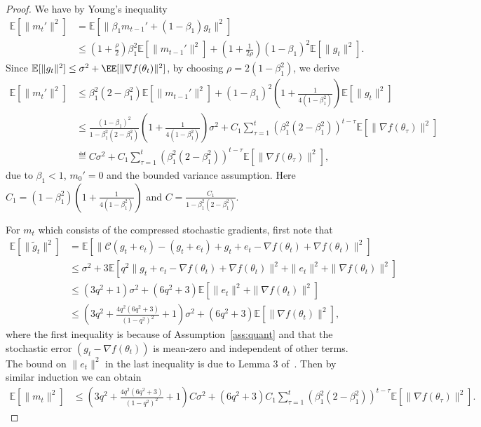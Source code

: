 \documentclass[11pt]{article}
\begin{document}
\begin{proof}
We have by Young's inequality
\begin{align*}
    \mathbb E[\|m_t'\|^2]&=\mathbb E[\|\beta_1m_{t-1}'+(1-\beta_1)g_t\|^2]\\
    &\leq (1+\frac{\rho}{2})\beta_1^2 \mathbb E[\|m_{t-1}'\|^2]+(1+\frac{1}{2\rho})(1-\beta_1)^2 \mathbb E[\|g_t\|^2].
\end{align*}
Since $\mathbb E[\|g_t\|^2]\leq \sigma^2+ \EE[\|\nabla f(\theta_t)\|^2]$, by choosing $\rho=2(1-\beta_1^2)$, we derive
\begin{align}
    \mathbb E[\|m_t'\|^2]&\leq \beta_1^2(2-\beta_1^2)\mathbb E[\|m_{t-1}'\|^2]+(1-\beta_1)^2(1+\frac{1}{4(1-\beta_1^2)})\mathbb E[\|g_t\|^2]\\
    &\leq \frac{(1-\beta_1)^2}{1-\beta_1^2(2-\beta_1^2)}(1+\frac{1}{4(1-\beta_1^2)})\sigma^2+C_1 \sum_{\tau=1}^t (\beta_1^2(2-\beta_1^2))^{t-\tau}\mathbb E[\|\nabla f(\theta_\tau)\|^2]\\
    &\eqdef C\sigma^2+C_1 \sum_{\tau=1}^t (\beta_1^2(2-\beta_1^2))^{t-\tau}\mathbb E[\|\nabla f(\theta_\tau)\|^2],
\end{align}
due to $\beta_1<1$, $m_0'=0$ and the bounded variance assumption. Here $C_1=(1-\beta_1^2)(1+\frac{1}{4(1-\beta_1^2)})$ and $C=\frac{C_1}{1-\beta_1^2(2-\beta_1^2)}$.

For $m_t$ which consists of the compressed stochastic gradients, first note that
\begin{align*}
    \mathbb E[\|\tilde g_t\|^2]&=\mathbb E[\|\mathcal C(g_t+e_t)-(g_t+e_t)+g_t+e_t-\nabla f(\theta_t)+\nabla f(\theta_t)\|^2]\\
    &\leq \sigma^2+3\mathbb E[q^2\|g_t+e_t-\nabla f(\theta_t)+\nabla f(\theta_t)\|^2+\|e_t\|^2+\|\nabla f(\theta_t)\|^2]\\
    &\leq (3 q^2+1)\sigma^2+(6q^2+3)\mathbb E[\|e_t\|^2+\|\nabla f(\theta_t)\|^2]\\
    &\leq (3q^2+\frac{4q^2(6q^2+3)}{(1-q^2)^2}+1)\sigma^2+(6q^2+3)\mathbb E[\|\nabla f(\theta_t)\|^2],
\end{align*}
where the first inequality is because of Assumption~\ref{ass:quant} and that the stochastic error $(g_t-\nabla f(\theta_t))$ is mean-zero and independent of other terms. The bound on $\|e_t\|^2$ in the last inequality is due to Lemma 3 of~\cite{karimireddy2019error}. Then by similar induction we can obtain
\begin{align*}
    \mathbb E[\|m_t\|^2]&\leq (3q^2+\frac{4q^2(6q^2+3)}{(1-q^2)^2}+1)C\sigma^2+(6q^2+3)C_1\sum_{\tau=1}^t (\beta_1^2(2-\beta_1^2))^{t-\tau}\mathbb E[\|\nabla f(\theta_\tau)\|^2].
\end{align*}


\end{proof}
\end{document}
